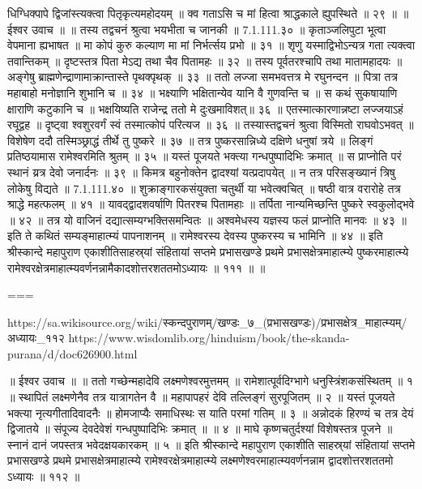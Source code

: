 धिग्धिक्पापे द्विजांस्त्यक्त्वा पितृकृत्यमहोदयम् ॥
क्व गताऽसि च मां हित्वा श्राद्धकाले ह्युपस्थिते ॥ २९ ॥
॥ ईश्वर उवाच ॥ ॥
तस्य तद्वचनं श्रुत्वा भयभीता च जानकी ॥ 7.1.111.३० ॥
कृताञ्जलिपुटा भूत्वा वेपमाना ह्यभाषत ॥
मा कोपं कुरु कल्याण मा मां निर्भर्त्सय प्रभो ॥ ३१ ॥
शृणु यस्माद्विभोऽन्यत्र गता त्यक्त्वा तवान्तिकम् ॥
दृष्टस्तत्र पिता मेऽद्य तथा चैव पितामहः ॥ ३२ ॥
तस्य पूर्वतरश्चापि तथा मातामहादयः ॥
अङ्गेषु ब्राह्मणेन्द्राणामाक्रान्तास्ते पृथक्पृथक् ॥ ३३ ॥
ततो लज्जा समभवत्तत्र मे रघुनन्दन ॥
पित्रा तत्र महाबाहो मनोज्ञानि शुभानि च ॥ ३४ ॥
भक्ष्याणि भक्षितान्येव यानि वै गुणवन्ति च ॥
स कथं सुकषायाणि क्षाराणि कटुकानि च ॥
भक्षयिष्यति राजेन्द्र ततो मे दुःखमाविशत्॥ ३६ ॥
एतस्मात्कारणान्नष्टा लज्जयाऽहं रघूद्वह ॥
दृष्ट्वा श्वशुरवर्गं स्वं तस्मात्कोपं परित्यज ॥ ३६ ॥
तस्यास्तद्वचनं श्रुत्वा विस्मितो राघवोऽभवत् ॥
विशेषेण ददौ तस्मिञ्छ्राद्धं तीर्थे तु पुष्करे ॥ ३७ ॥
तत्र पुष्करसान्निध्ये दक्षिणे धनुषां त्रये ॥
लिङ्गं प्रतिष्ठयामास रामेश्वरमिति श्रुतम् ॥ ३५ ॥
यस्तं पूजयते भक्त्या गन्धपुष्पादिभिः क्रमात् ॥
स प्राप्नोति परं स्थानं य्रत्र देवो जनार्दनः ॥ ३९ ॥
किमत्र बहुनोक्तेन द्वादश्यां यत्प्रदापयेत् ॥
न तत्र परिसङ्ख्यानं त्रिषु लोकेषु विद्यते ॥ 7.1.111.४० ॥
शुक्राङ्गारकसंयुक्ता चतुर्थी या भवेत्क्वचित् ॥
षष्ठी वात्र वरारोहे तत्र श्राद्धे महत्फलम् ॥ ४१ ॥
यावद्द्वादशवर्षाणि पितरश्च पितामहाः ॥
तर्पिता नान्यमिच्छन्ति पुष्करे स्वकुलोद्भवे ॥ ४२ ॥
तत्र यो वाजिनं दद्यात्सम्यग्भक्तिसमन्वितः ॥
अश्वमेधस्य यज्ञस्य फलं प्राप्नोति मानवः ॥ ४३ ॥
इति ते कथितं सम्यङ्माहात्म्यं पापनाशनम् ॥
रामेश्वरस्य देवस्य पुष्करस्य च भामिनि ॥ ४४ ॥
इति श्रीस्कान्दे महापुराण एकाशीतिसाहस्र्यां संहितायां सप्तमे प्रभासखण्डे प्रथमे प्रभासक्षेत्रमाहात्म्ये पुष्करमाहात्म्ये रामेश्वरक्षेत्रमाहात्म्यवर्णनन्नामैकादशोत्तरशततमोऽध्यायः ॥ १११ ॥ ॥

===

https://sa.wikisource.org/wiki/स्कन्दपुराणम्/खण्डः_७_(प्रभासखण्डः)/प्रभासक्षेत्र_माहात्म्यम्/अध्यायः_११२
https://www.wisdomlib.org/hinduism/book/the-skanda-purana/d/doc626900.html


॥ ईश्वर उवाच ॥ ॥
ततो गच्छेन्महादेवि लक्ष्मणेश्वरमुत्तमम् ॥
रामेशात्पूर्वदिग्भागे धनुस्त्रिंशकसंस्थितम् ॥ १ ॥
स्थापितं लक्ष्मणेनैव तत्र यात्रागतेन वै ॥
महापापहरं देवि तल्लिङ्गं सुरपूजितम् ॥ २ ॥
यस्तं पूजयते भक्त्या नृत्यगीतादिवादनैः ॥
होमजाप्यैः समाधिस्थः स याति परमां गतिम् ॥ ३ ॥
अन्नोदकं हिरण्यं च तत्र देयं द्विजातये ॥
संपूज्य देवदेवेशं गन्धपुष्पादिभिः क्रमात् ॥ ॥ ४ ॥
माघे कृष्णचतुर्दश्यां विशेषस्तत्र पूजने ॥
स्नानं दानं जपस्तत्र भवेदक्षयकारकम् ॥ ५ ॥
इति श्रीस्कान्दे महापुराण एकाशीति साहस्र्यां संहितायां सप्तमे प्रभासखण्डे प्रथमे प्रभासक्षेत्रमाहात्म्ये रामेश्वरक्षेत्रमाहात्म्ये लक्ष्मणेश्वरमाहात्म्यवर्णनन्नाम द्वादशोत्तरशततमो ऽध्यायः ॥ ११२ ॥


